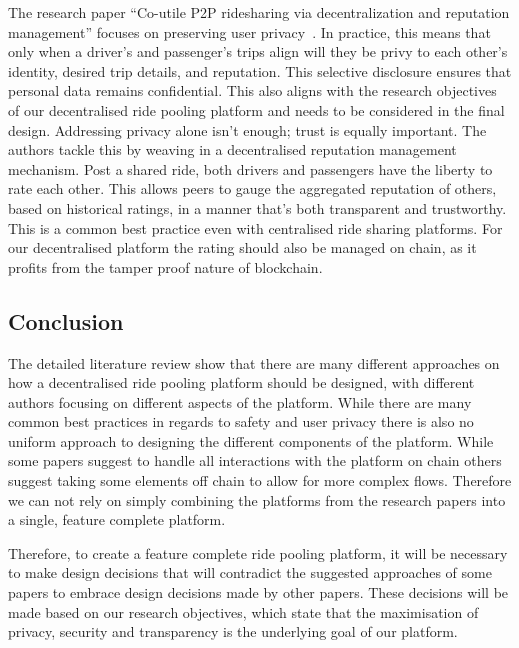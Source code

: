 The research paper ``Co-utile P2P ridesharing via decentralization and reputation management'' focuses on preserving user privacy~\cite{Sanchez.2016}. In practice, this means that only when a driver's and passenger's trips align will they be privy to each other's identity, desired trip details, and reputation. This selective disclosure ensures that personal data remains confidential. This also aligns with the research objectives of our decentralised ride pooling platform and needs to be considered in the final design.
Addressing privacy alone isn't enough; trust is equally important. The authors tackle this by weaving in a decentralised reputation management mechanism. Post a shared ride, both drivers and passengers have the liberty to rate each other. This allows peers to gauge the aggregated reputation of others, based on historical ratings, in a manner that's both transparent and trustworthy. This is a common best practice even with centralised ride sharing platforms. For our decentralised platform the rating should also be managed on chain, as it profits from the tamper proof nature of blockchain.

\subsection{Conclusion}
The detailed literature review show that there are many different approaches on how a decentralised ride pooling platform should be designed, with different authors focusing on different aspects of the platform. While there are many common best practices in regards to safety and user privacy there is also no uniform approach to designing the different components of the platform. While some papers suggest to handle all interactions with the platform on chain others suggest taking some elements off chain to allow for more complex flows. Therefore we can not rely on simply combining the platforms from the research papers into a single, feature complete platform.

Therefore, to create a feature complete ride pooling platform, it will be necessary to make design decisions that will contradict the suggested approaches of some papers to embrace design decisions made by other papers. These decisions will be made based on our research objectives, which state that the maximisation of privacy, security and transparency is the underlying goal of our platform.


